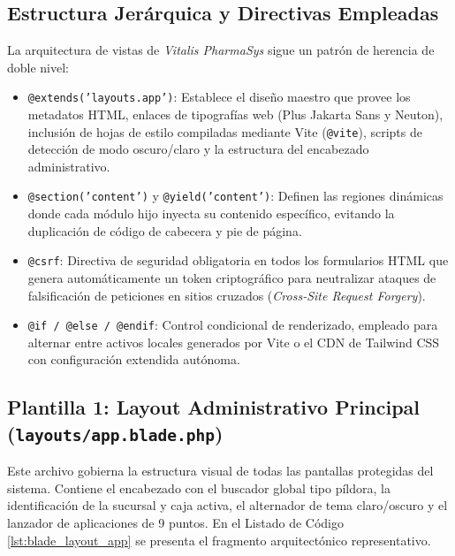 \subsection{Estructura Jerárquica y Directivas Empleadas}
La arquitectura de vistas de \textit{Vitalis PharmaSys} sigue un patrón de herencia de doble nivel:
\begin{itemize}
    \item \texttt{@extends('layouts.app')}: Establece el diseño maestro que provee los metadatos HTML, enlaces de tipografías web (Plus Jakarta Sans y Neuton), inclusión de hojas de estilo compiladas mediante Vite (\texttt{@vite}), scripts de detección de modo oscuro/claro y la estructura del encabezado administrativo.
    \item \texttt{@section('content')} y \texttt{@yield('content')}: Definen las regiones dinámicas donde cada módulo hijo inyecta su contenido específico, evitando la duplicación de código de cabecera y pie de página.
    \item \texttt{@csrf}: Directiva de seguridad obligatoria en todos los formularios HTML que genera automáticamente un token criptográfico para neutralizar ataques de falsificación de peticiones en sitios cruzados (\textit{Cross-Site Request Forgery}).
    \item \texttt{@if / @else / @endif}: Control condicional de renderizado, empleado para alternar entre activos locales generados por Vite o el CDN de Tailwind CSS con configuración extendida autónoma.
\end{itemize}

\subsection{Plantilla 1: Layout Administrativo Principal (\texttt{layouts/app.blade.php})}
Este archivo gobierna la estructura visual de todas las pantallas protegidas del sistema. Contiene el encabezado con el buscador global tipo píldora, la identificación de la sucursal y caja activa, el alternador de tema claro/oscuro y el lanzador de aplicaciones de 9 puntos. En el Listado de Código \ref{lst:blade_layout_app} se presenta el fragmento arquitectónico representativo.

